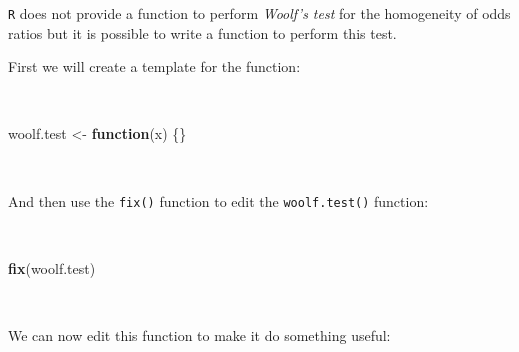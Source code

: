 \documentclass[12pt,a4paper]{book}
\newenvironment{Shaded}{\begin{snugshade}}{\end{snugshade}}
\newcommand{\KeywordTok}[1]{\textcolor[rgb]{0.13,0.29,0.53}{\textbf{#1}}}
\newcommand{\StringTok}[1]{\textcolor[rgb]{0.31,0.60,0.02}{#1}}
\newcommand{\ControlFlowTok}[1]{\textcolor[rgb]{0.13,0.29,0.53}{\textbf{#1}}}
\newcommand{\NormalTok}[1]{#1}
\theoremstyle{definition}
\theoremstyle{definition}
\theoremstyle{definition}
\theoremstyle{remark}
\begin{document}
\texttt{R} does not provide a function to perform \emph{Woolf's test}
for the homogeneity of odds ratios but it is possible to write a
function to perform this test.

First we will create a template for the function:

~

\begin{Shaded}
\begin{Highlighting}[]
\NormalTok{woolf.test <-}\StringTok{ }\ControlFlowTok{function}\NormalTok{(x) \{\}}
\end{Highlighting}
\end{Shaded}

~

And then use the \texttt{fix()} function to edit the
\texttt{woolf.test()} function:

~

\begin{Shaded}
\begin{Highlighting}[]
\KeywordTok{fix}\NormalTok{(woolf.test)}
\end{Highlighting}
\end{Shaded}

~

We can now edit this function to make it do something useful:

~
\end{document}

